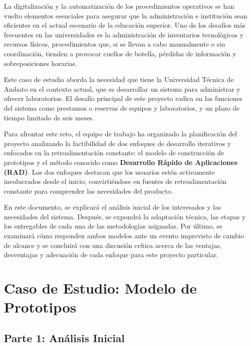 \documentclass[pdflatex,sn-mathphys-num]{sn-jnl}%
\theoremstyle{thmstyleone}%
\theoremstyle{thmstyletwo}%
\theoremstyle{thmstylethree}%
\begin{document}
La digitalización y la automatización de los procedimientos operativos se han vuelto elementos esenciales para asegurar que la administración e institución sean eficientes en el actual escenario de la educación superior. Uno de los desafíos más frecuentes en las universidades es la administración de inventarios tecnológicos y recursos físicos, procedimientos que, si se llevan a cabo manualmente o sin coordinación, tienden a provocar cuellos de botella, pérdidas de información y sobreposiciones horarias.

Este caso de estudio aborda la necesidad que tiene la Universidad Técnica de Ambato en el contexto actual, que es desarrollar un sistema para administrar y ofrecer laboratorios. El desafío principal de este proyecto radica en las funciones del sistema como prestamos o reservas de equipos y laboratorios, y un plazo de tiempo limitado de seis meses.

Para afrontar este reto, el equipo de trabajo ha organizado la planificación del proyecto analizando la factibilidad de dos enfoques de desarrollo iterativos y enfocados en la retroalimentación constante: el modelo de construcción de prototipos y el método conocido como \textbf{Desarrollo Rápido de Aplicaciones (RAD)}. Los dos enfoques destacan que los usuarios estén activamente involucrados desde el inicio, convirtiéndose en fuentes de retroalimentación constante para comprender las necesidades del producto.

En este documento, se explicará el análisis inicial de los interesados y las necesidades del sistema. Después, se expondrá la adaptación técnica, las etapas y los entregables de cada una de las metodologías asignadas. Por último, se examinará cómo responden ambos modelos ante un evento imprevisto de cambio de alcance y se concluirá con una discusión crítica acerca de las ventajas, desventajas y adecuación de cada enfoque para este proyecto particular.
 \section{Caso de Estudio: Modelo de Prototipos}\label{sec:prototipos}
 
 \subsection{Parte 1: Análisis Inicial}
 
\end{document}
